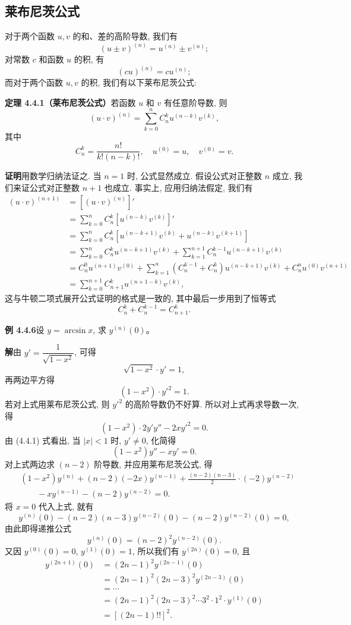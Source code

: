 \documentclass[UTF8, 12pt, fontset=fandol, oneside]{ctexart}
\begin{document}
\subsection{莱布尼茨公式}

对于两个函数 $u,v$ 的和、差的高阶导数, 我们有
\[
  (u\pm v)^{(n)}=u^{(n)}\pm v^{(n)};
\]
对常数 $c$ 和函数 $u$ 的积, 有
\[
  (cu)^{(n)}=cu^{(n)};
\]
而对于两个函数 $u,v$ 的积, 我们有以下莱布尼茨公式:

\noindent\textbf{定理 4.4.1（莱布尼茨公式）}\quad 若函数 $u$ 和 $v$ 有任意阶导数, 则
\[
  (u\cdot v)^{(n)}
  =
  \sum_{k=0}^{n}C_n^ku^{(n-k)}v^{(k)},
\]
其中
\[
  C_n^k=\frac{n!}{k!(n-k)!},\quad u^{(0)}=u,\quad v^{(0)}=v.
\]

\noindent\textbf{证明}\quad 用数学归纳法证之. 当 $n=1$ 时, 公式显然成立. 假设公式对正整数 $n$ 成立, 我们来证公式对正整数 $n+1$ 也成立. 事实上, 应用归纳法假定, 我们有
\[
\begin{aligned}
  (u\cdot v)^{(n+1)}
  &=
  \left[(u\cdot v)^{(n)}\right]'  \\
  &=
  \sum_{k=0}^{n}C_n^k\left[u^{(n-k)}v^{(k)}\right]'  \\
  &=
  \sum_{k=0}^{n}C_n^k
  \left[u^{(n-k+1)}v^{(k)}+u^{(n-k)}v^{(k+1)}\right]  \\
  &=
  \sum_{k=0}^{n}C_n^ku^{(n-k+1)}v^{(k)}
  +
  \sum_{k=1}^{n+1}C_n^{k-1}u^{(n-k+1)}v^{(k)}  \\
  &=
  C_n^0u^{(n+1)}v^{(0)}
  +
  \sum_{k=1}^{n}(C_n^{k-1}+C_n^k)u^{(n-k+1)}v^{(k)}
  +
  C_n^nu^{(0)}v^{(n+1)}  \\
  &=
  \sum_{k=0}^{n+1}C_{n+1}^ku^{(n+1-k)}v^{(k)},
\end{aligned}
\]
这与牛顿二项式展开公式证明的格式是一致的, 其中最后一步用到了恒等式
\[
  C_n^k+C_n^{k-1}=C_{n+1}^k.
\]

\noindent\textbf{例 4.4.6}\quad 设 $y=\arcsin x$, 求 $y^{(n)}(0)$。

\noindent\textbf{解}\quad 由 $y'=\dfrac{1}{\sqrt{1-x^2}}$, 可得
\[
  \sqrt{1-x^2}\cdot y'=1,
\]
再两边平方得
\[
  (1-x^2)\cdot y'^2=1. \tag{4.4.1}
\]
若对上式用莱布尼茨公式, 则 $y'^2$ 的高阶导数仍不好算. 所以对上式再求导数一次, 得
\[
  (1-x^2)\cdot 2y'y''-2xy'^2=0.
\]
由 (4.4.1) 式看出, 当 $|x|<1$ 时, $y'\ne0$, 化简得
\[
  (1-x^2)y''-xy'=0.
\]
对上式两边求 $(n-2)$ 阶导数, 并应用莱布尼茨公式, 得
\[
\begin{aligned}
  &(1-x^2)y^{(n)}
  +(n-2)(-2x)y^{(n-1)}
  +\frac{(n-2)(n-3)}{2}\cdot(-2)y^{(n-2)}  \\
  &\qquad
  -xy^{(n-1)}-(n-2)y^{(n-2)}=0.
\end{aligned}
\]
将 $x=0$ 代入上式, 就有
\[
  y^{(n)}(0)
  -(n-2)(n-3)y^{(n-2)}(0)
  -(n-2)y^{(n-2)}(0)=0,
\]
由此即得递推公式
\[
  y^{(n)}(0)=(n-2)^2y^{(n-2)}(0).
\]
又因 $y^{(0)}(0)=0$, $y^{(1)}(0)=1$, 所以我们有 $y^{(2n)}(0)=0$, 且
\[
\begin{aligned}
  y^{(2n+1)}(0)
  &=
  (2n-1)^2y^{(2n-1)}(0)  \\
  &=
  (2n-1)^2(2n-3)^2y^{(2n-3)}(0)  \\
  &=\cdots  \\
  &=
  (2n-1)^2(2n-3)^2\cdots3^2\cdot1^2\cdot y^{(1)}(0)  \\
  &=
  [(2n-1)!!]^2.
\end{aligned}
\]
\end{document}
